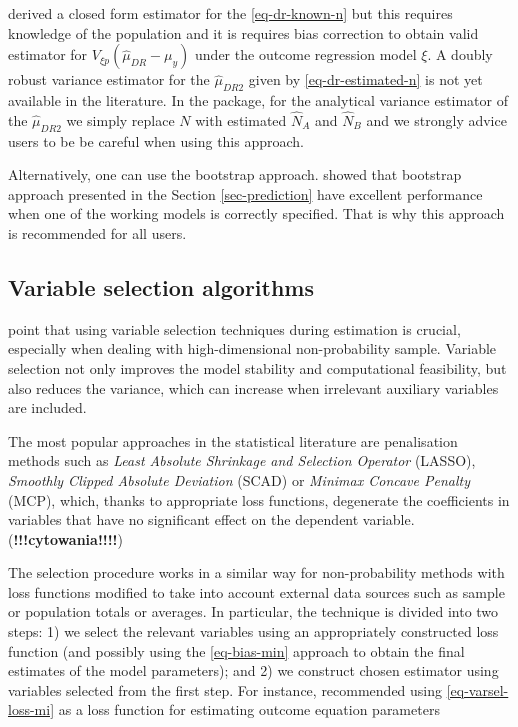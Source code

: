 \documentclass[
]{jss}
\begin{document}
\citet{yang_doubly_2020} derived a closed form estimator for the
\eqref{eq-dr-known-n} but this requires knowledge of the population and
it is requires bias correction to obtain valid estimator for
\(V_{\xi p}\left(\hat{\mu}_{DR}-\mu_y\right)\) under the outcome
regression model \(\xi\). A doubly robust variance estimator for the
\(\hat{\mu}_{DR2}\) given by \eqref{eq-dr-estimated-n} is not yet
available in the literature. In the package, for the analytical variance
estimator of the \(\hat{\mu}_{DR2}\) we simply replace \(N\) with
estimated \(\hat{N}_A\) and \(\hat{N}_B\) and we strongly advice users
to be be careful when using this approach.

Alternatively, one can use the bootstrap approach.
\citet{chen2020doubly} showed that bootstrap approach presented in the
Section \ref{sec-prediction} have excellent performance when one of the
working models is correctly specified. That is why this approach is
recommended for all users.

\subsection{Variable selection algorithms}\label{sec-varsel}

\citet{yang_asymptotic_2020} point that using variable selection
techniques during estimation is crucial, especially when dealing with
high-dimensional non-probability sample. Variable selection not only
improves the model stability and computational feasibility, but also
reduces the variance, which can increase when irrelevant auxiliary
variables are included.

The most popular approaches in the statistical literature are
penalisation methods such as
\textit{Least Absolute Shrinkage and Selection Operator} (LASSO),
\textit{Smoothly Clipped Absolute Deviation} (SCAD) or
\textit{Minimax Concave Penalty} (MCP), which, thanks to appropriate
loss functions, degenerate the coefficients in variables that have no
significant effect on the dependent variable.
(\textbf{!!!cytowania!!!!})

The selection procedure works in a similar way for non-probability
methods with loss functions modified to take into account external data
sources such as sample or population totals or averages. In particular,
the technique is divided into two steps: 1) we select the relevant
variables using an appropriately constructed loss function (and possibly
using the \eqref{eq-bias-min} approach to obtain the final estimates of
the model parameters); and 2) we construct chosen estimator using
variables selected from the first step. For instance,
\citet{yang_doubly_2020} recommended using \eqref{eq-varsel-loss-mi} as
a loss function for estimating outcome equation parameters
\end{document}
